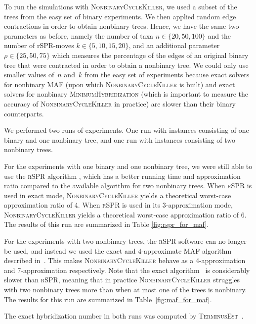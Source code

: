 To run the simulations with \textsc{NonbinaryCycleKiller}, we used a subset of the trees from the easy set of binary experiments. We then applied random edge contractions in order to obtain nonbinary trees. Hence, we have the same two parameters as before, namely the number of taxa $n \in\{20, 50, 100\}$ and the number of rSPR-moves $k \in \{5, 10, 15, 20\}$, and an additional parameter $\rho \in \{25, 50, 75\}$ which measures the percentage of the edges of an original binary tree that were contracted in order to obtain a nonbinary tree. We could only use smaller values of~$n$ and~$k$ from the easy set of experiments because exact solvers for nonbinary MAF (upon which \textsc{NonbinaryCycleKiller} is built) and exact solvers for nonbinary \textsc{MinimumHybridization} (which is important to measure the accuracy of \textsc{NonbinaryCycleKiller} in practice) are slower than their binary counterparts.

We performed two runs of experiments. One run with instances consisting of one binary and one nonbinary tree, and one run with instances consisting of two nonbinary trees.

For the experiments with one binary and one nonbinary tree, we were still able to use the \textsc{rSPR} algorithm \cite{whiddenRSPRwebsite,whiddenFixed}, which has a better running time and approximation ratio compared to the available algorithm for two nonbinary trees. When \textsc{rSPR} is used in exact mode, \textsc{NonbinaryCycleKiller} yields a theoretical worst-case approximation ratio of 4. When \textsc{rSPR} is used in its 3-approximation mode, \textsc{NonbinaryCycleKiller} yields a theoretical worst-case approximation ratio of 6. %
The results of this run are summarized in Table \ref{fig:rspr_for_maf}.

For the experiments with two nonbinary trees, the \textsc{rSPR} software can no longer be used, and instead we used the exact and 4-approximate MAF algorithm described in~\cite{nonbinCK}. This makes \textsc{NonbinaryCycleKiller} behave as a 4-approximation and 7-approximation respectively. %
Note that the exact algorithm~\cite{nonbinCK} is considerably slower than \textsc{rSPR}, meaning that in practice \textsc{NonbinaryCycleKiller} struggles with two nonbinary trees more than
when at most one of the trees is nonbinary. The results for this run are summarized in Table~\ref{fig:maf_for_maf}.

The exact hybridization number in both runs was computed by \textsc{TerminusEst}~\cite{testURL}.

